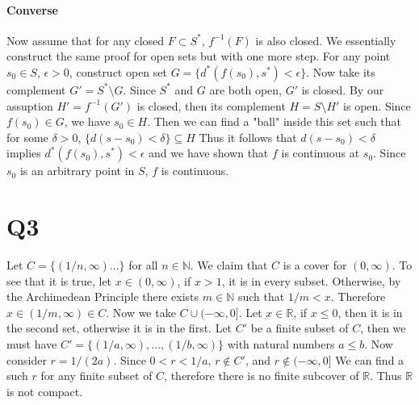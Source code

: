 \documentclass[12pt]{article}
\newcommand{\N}{\mathbb{N}}
\newcommand{\R}{\mathbb{R}}
\begin{document}
\paragraph{Converse}
\newline
Now assume that for any closed $F \subset S^{*}$,  $f^{-1}(F)$ is also closed. We essentially construct the same proof for open sets but with one more step. For any point $s_0 \in S$, $\epsilon >0$,  construct open set $G = \{d^{*}(f(s_0), s^{*}) < \epsilon\}$. Now take its complement $G' = S^{*} \setminus G$. Since $S^{*}$ and $G$ are both open, $G'$ is closed.
\newline
By our assuption $H' = f^{-1}(G')$ is closed, then its complement $H = S \setminus H'$ is open. Since $f(s_0) \in G$, we have $s_0 \in H$. Then we can find a "ball" inside this set such that for some $\delta >0$, $\{d(s-s_0)<\delta\} \subseteq H$
\newline
Thus it follows that $d(s-s_0)<\delta$ implies $d^{*}(f(s_0), s^{*}) < \epsilon$ and we have shown that $f$ is continuous at $s_0$. Since $s_0$ is an arbitrary point in $S$, $f$ is continuous.
\newpage


\section{Q3}
Let $C = \{(1/n, \infty)...\}$ for all $n \in \N$.
We claim that $C$ is a cover for $(0, \infty)$. To see that it is true, let $x \in (0, \infty)$, if $x>1$, it is in every subset. Otherwise, by the Archimedean Principle there exists $m \in \N$ such that $1/m < x$. Therefore $x \in (1/m, \infty) \in C$.
\newline
Now we take $C \cup (-\infty, 0]$. Let $x \in \R$, if $ x\leq 0$, then it is in the second set, otherwise it is in the first.
\newline
Let $C'$ be a finite subset of $C$, then we must have $C' = \{(1/a, \infty), ..., (1/b, \infty)\}$ with natural numbers $a \leq b$. Now consider $r = 1/(2a)$. Since $0<r<1/a$, $r \not \in C'$, and $r \not \in (-\infty, 0]$
\newline
We can find a such $r$ for any finite subset of $C$, therefore there is no finite subcover of $\R$. Thus $\R$ is not compact.
\newpage
\end{document}
